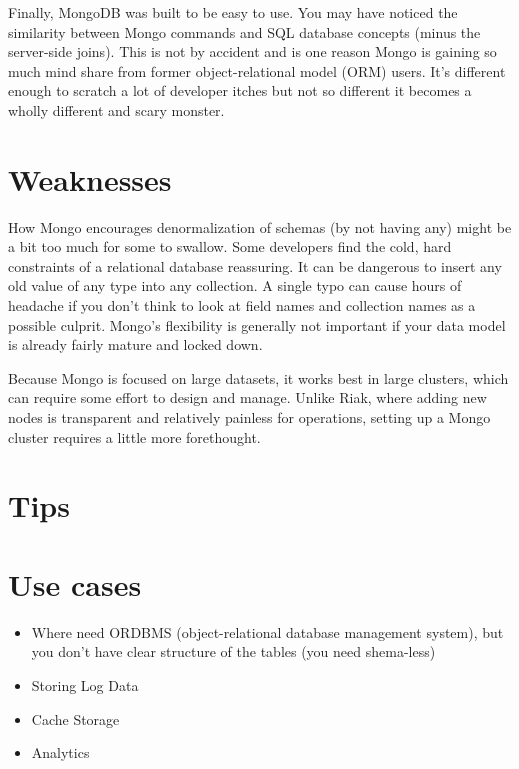 Finally, MongoDB was built to be easy to use. You may have noticed the similarity between Mongo commands and SQL database concepts (minus the server-side joins). This is not by accident and is one reason Mongo is gaining so much mind share from former object-relational model (ORM) users. It’s different enough to scratch a lot of developer itches but not so different it becomes a wholly different and scary monster.\cite{seven_databases}

\section{Weaknesses}

How Mongo encourages denormalization of schemas (by not having any) might be a bit too much for some to swallow. Some developers find the cold, hard constraints of a relational database reassuring. It can be dangerous to insert any old value of any type into any collection. A single typo can cause hours of headache if you don’t think to look at field names and collection names as a possible culprit. Mongo’s flexibility is generally not important if your data model is already fairly mature and locked down.

Because Mongo is focused on large datasets, it works best in large clusters, which can require some effort to design and manage. Unlike Riak, where adding new nodes is transparent and relatively painless for operations, setting up a Mongo cluster requires a little more forethought.\cite{seven_databases}

\section{Tips}

\section{Use cases}

\begin{itemize}
  \item Where need ORDBMS (object-relational database management system), but you don't have clear structure of the tables (you need shema-less)
  \item Storing Log Data
  \item Cache Storage
  \item Analytics
\end{itemize}